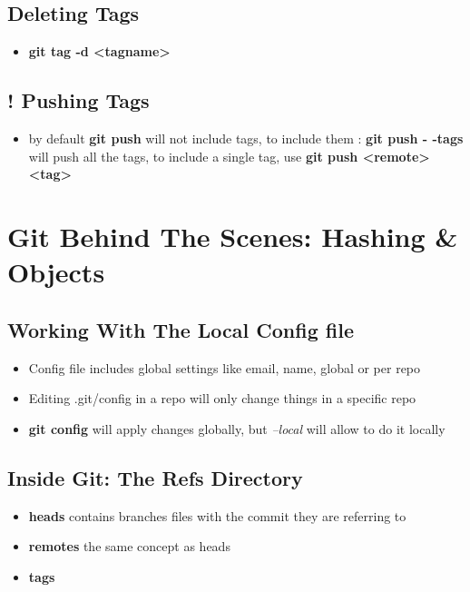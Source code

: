 \documentclass{report}
\newcommand{\warning}{
	{\fontencoding{U}\fontfamily{futs}\selectfont\char 66\relax}
}
\begin{document}
\section{Deleting Tags}

\begin{itemize}
	\item \textbf{git tag -d <tagname>} 
\end{itemize}


\section{! Pushing Tags}

\begin{itemize}
	\item \warning by default \textbf{git push} will not include tags, to include them : \textbf{git push - -tags} will push all the tags, to include a single tag, use \textbf{git push <remote> <tag>} 
\end{itemize}



\chapter{Git Behind The Scenes: Hashing \& Objects}


\section{Working With The Local Config file}

\begin{itemize}
	\item Config file includes global settings like email, name, global or per repo 
	\item Editing .git/config in a repo will only change things in a specific repo 
	\item \textbf{git config} will apply changes globally, but \textit{--local} will allow to do it locally
\end{itemize}


\section{Inside Git: The Refs Directory}

\begin{itemize}
	\item \textbf{heads} contains branches files with the commit they are referring to
	\item \textbf{remotes} the same concept as heads
	\item \textbf{tags} 
\end{itemize}
\end{document}
